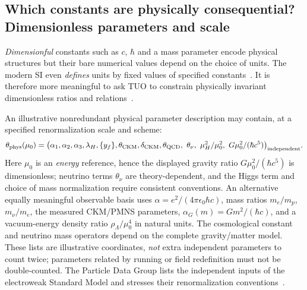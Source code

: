 \documentclass[11pt,a4paper]{article}
\theoremstyle{tmon}
\theoremstyle{definition}
\begin{document}
\subsection{Which constants are physically consequential? Dimensionless parameters and scale}
\emph{Dimensionful} constants such as $c$, $\hbar$ and a mass parameter encode physical structures but their bare numerical values depend on the choice of units. The modern SI even \emph{defines} units by fixed values of specified constants~\cite{BIPMUnits}. It is therefore more meaningful to ask TUO to constrain physically invariant dimensionless ratios and relations~\cite{UzanConstants}.

An illustrative nonredundant physical parameter description may contain, at a specified renormalization scale and scheme:
\begin{equation}\label{eq:c001theta}
\theta_{\rm phys}(\mu_0)=\big(\alpha_1,\alpha_2,\alpha_3,\lambda_H,
\{y_f\},\theta_{\rm CKM},\delta_{\rm CKM},\theta_{\rm QCD},\
\theta_{\nu},\ \mu_H^2/\mu_0^2,\ G\mu_0^2/(\hbar c^5)\big)_{\rm independent}.
\end{equation}
Here $\mu_0$ is an \emph{energy} reference, hence the displayed gravity ratio $G\mu_0^2/(\hbar c^5)$ is dimensionless; neutrino terms $\theta_\nu$ are theory-dependent, and the Higgs term and choice of mass normalization require consistent conventions. An alternative equally meaningful observable basis uses $\alpha=e^2/(4\pi\epsilon_0\hbar c)$, mass ratios $m_e/m_p$, $m_\nu/m_e$, the measured CKM/PMNS parameters, $\alpha_G(m)=Gm^2/(\hbar c)$, and a vacuum-energy density ratio $\rho_\Lambda/\mu_0^4$ in natural units. The cosmological constant and neutrino mass operators depend on the complete gravity/matter model. These lists are illustrative coordinates, \emph{not} extra independent parameters to count twice; parameters related by running or field redefinition must not be double-counted. The Particle Data Group lists the independent inputs of the electroweak Standard Model and stresses their renormalization conventions~\cite{PDGEW2025}.
\end{document}
